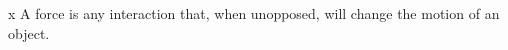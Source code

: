 \documentclass[preview]{standalone}
\begin{document}
\begin{defn*}{x}
A force is any interaction that, when unopposed, will change the motion of an object.
\end{defn*}
\end{document}

